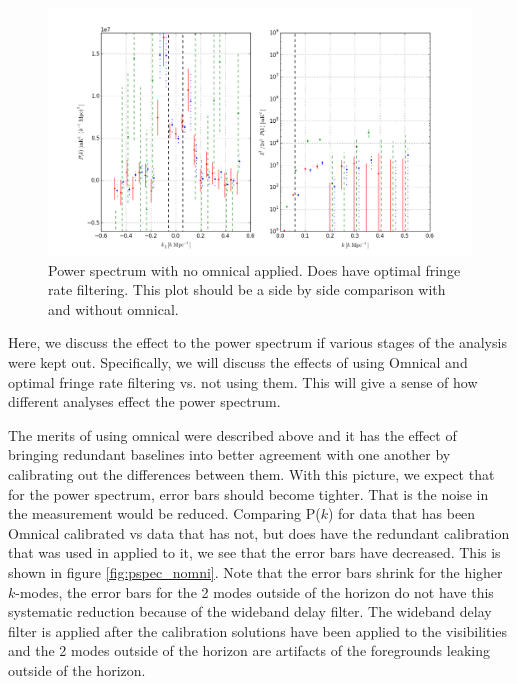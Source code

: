 \documentclass[twocolumn,numberedappendix]{emulateapj} \shorttitle{PSA64}
\begin{document}
\begin{figure}[t!]\centering
\includegraphics[width=1.5\columnwidth]{plots/pspec_comparison.png}
\caption{Power spectrum with no omnical applied. Does have optimal fringe rate
        filtering. This plot should be a side by side comparison with and
        without omnical.}
\label{fig:pspec_comp}
\end{figure}

Here, we discuss the effect to the power spectrum if various stages of the
analysis were kept out. Specifically, we will discuss the effects of using
Omnical and optimal fringe rate filtering vs. not using them. This will give a
sense of how different analyses effect the power spectrum.

The merits of using omnical were described above and it has the effect of
bringing redundant baselines into better agreement with one another by
calibrating out the differences between them. With this picture, we expect
that for the power spectrum, error bars should become tighter. That is the
noise in the measurement would be reduced. Comparing P($k$) for data that has
been Omnical calibrated vs data that has not, but does have the redundant
calibration that was used in \cite{parsons_et_al2014} applied to it, we see that
the error bars have decreased. This is shown in figure \ref{fig:pspec_nomni}.
Note that the error bars shrink for the higher $k$-modes, the error bars for the
2 modes outside of the horizon do not have this systematic reduction because of
the wideband delay filter. The wideband delay filter is applied after the
calibration solutions have been applied to the visibilities and the 2 modes
outside of the horizon are artifacts of the foregrounds leaking outside of the
horizon. 
\end{document}
